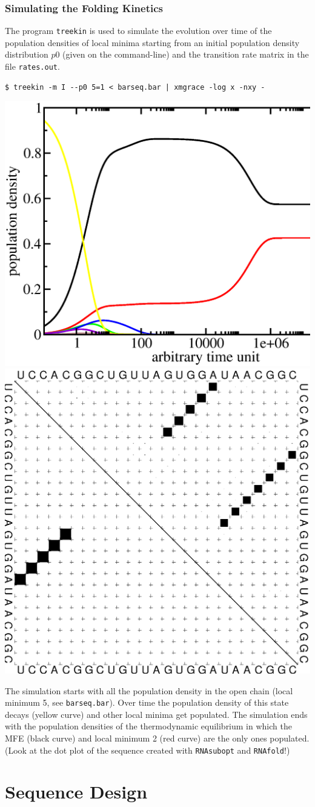 \documentclass[a4paper]{article}
\newcommand{\frametitle}[1]{\subsubsection{#1}}
\begin{document}
\frametitle{Simulating the Folding Kinetics}
\noindent
The program \texttt{treekin} is used to simulate the evolution over time of the
population densities of local minima starting from an initial population
density distribution $p0$ (given on the command-line) and the
transition rate matrix in the file \texttt{rates.out}.
\begin{verbatim}
$ treekin -m I --p0 5=1 < barseq.bar | xmgrace -log x -nxy -
\end{verbatim}%
\begin{center}
  \includegraphics[width=.5\textwidth]{Figures/FOO.eps}\hfill
  \includegraphics[width=.40\textwidth]{Figures/FOO_dp.eps}
\end{center}
The simulation starts with all the population density in the open chain
(local minimum 5, see \texttt{barseq.bar}). Over time the population density of this state decays
(yellow curve) and other local minima get populated. The simulation ends
with the population densities of the thermodynamic equilibrium in which the
MFE (black curve) and local minimum 2 (red curve) are the only ones
populated. (Look at the dot plot of the sequence created with \texttt{RNAsubopt} 
and \texttt{RNAfold}!)

\pagebreak[4]
\section{Sequence Design}
\end{document}
